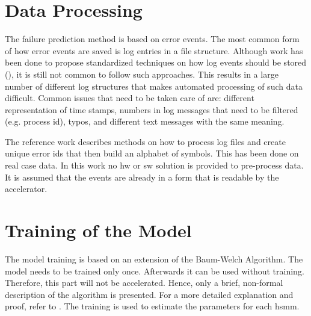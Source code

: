 \documentclass[mscthesis]{usiinfthesis}
\begin{document}
\section{Data Processing}
\label{ch:event_data}

The failure prediction method is based on error events. The most common form of
how error events are saved is log entries in a file structure. Although work
has been done to propose standardized techniques on how log events should be
stored (\cite{IPDPS04_Salfner, DSN09_Ziming}), it is still not common to
follow such approaches. This results in a large number of different log
structures that makes automated processing of such data difficult. Common
issues that need to be taken care of are: different representation of time
stamps, numbers in log messages that need to be filtered (e.g. process id),
typos, and different text messages with the same meaning.

The reference work \cite{salfner08} describes methods on how to process log
files and create unique error ids that then build an alphabet of symbols. This
has been done on real case data. In this work no \gls{hw} or \gls{sw} solution
is provided to pre-process data. It is assumed that the events are already in
a form that is readable by the accelerator.

\section{Training of the Model}
\label{ch:event_train}

The model training is based on an extension of the Baum-Welch Algorithm. The
model needs to be trained only once. Afterwards it can be used without
training.  Therefore, this part will not be accelerated. Hence, only a brief,
non-formal description of the algorithm is presented. For a more detailed
explanation and proof, refer to \cite{salfner08}. The training is used to
estimate the parameters for each \gls{hsmm}.
\end{document}
